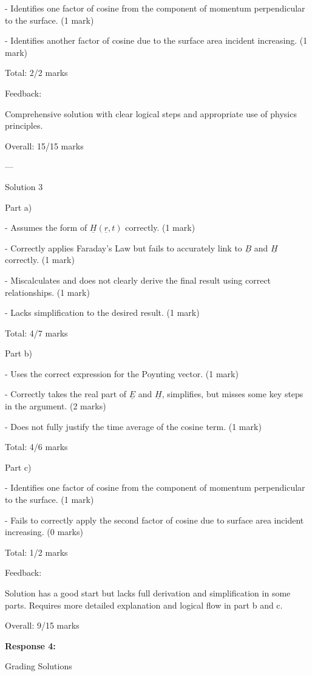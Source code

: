 \documentclass[a4paper,11pt]{article}
\begin{document}
- Identifies one factor of cosine from the component of momentum perpendicular to the surface. (1 mark)

- Identifies another factor of cosine due to the surface area incident increasing. (1 mark)

Total: 2/2 marks

Feedback:

Comprehensive solution with clear logical steps and appropriate use of physics principles.

Overall: 15/15 marks

---

Solution 3

Part a)

- Assumes the form of \(\underline{H}(\underline{r}, t)\) correctly. (1 mark)

- Correctly applies Faraday's Law but fails to accurately link to \(\underline{B}\) and \(\underline{H}\) correctly. (1 mark)

- Miscalculates and does not clearly derive the final result using correct relationships. (1 mark)

- Lacks simplification to the desired result. (1 mark)

Total: 4/7 marks

Part b)

- Uses the correct expression for the Poynting vector. (1 mark)

- Correctly takes the real part of \(\underline{E}\) and \(\underline{H}\), simplifies, but misses some key steps in the argument. (2 marks)

- Does not fully justify the time average of the cosine term. (1 mark)

Total: 4/6 marks

Part c)

- Identifies one factor of cosine from the component of momentum perpendicular to the surface. (1 mark)

- Fails to correctly apply the second factor of cosine due to surface area incident increasing. (0 marks)

Total: 1/2 marks

Feedback:

Solution has a good start but lacks full derivation and simplification in some parts. Requires more detailed explanation and logical flow in part b and c.

Overall: 9/15 marks

\bigskip
\textbf{Response 4:}

Grading Solutions
\end{document}
